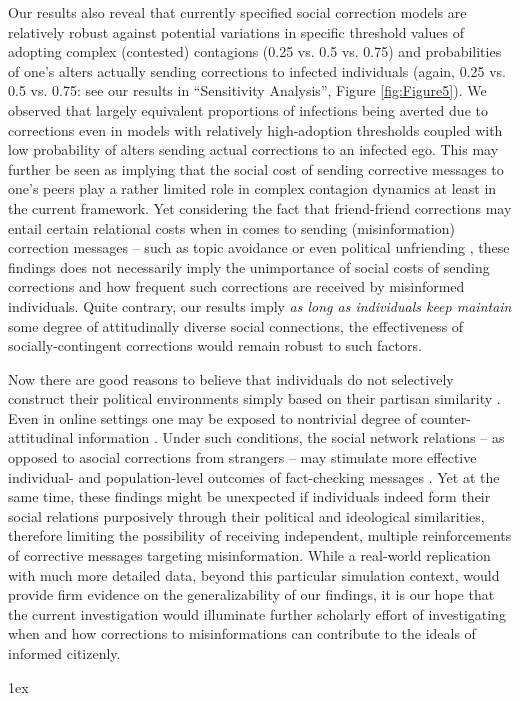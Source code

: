 \documentclass[man, 12pt, a4paper, nolmodern, noextraspace]{apa6}
\begin{document}
    Our results also reveal that currently specified social correction models are relatively robust against potential variations in specific threshold values of adopting complex (contested) contagions (0.25 vs. 0.5 vs. 0.75) and probabilities of one's alters actually sending corrections to infected individuals (again, 0.25 vs. 0.5 vs. 0.75: see our results in ``Sensitivity Analysis'', Figure \ref{fig:Figure5}). We observed that largely equivalent proportions of infections being averted due to corrections even in models with relatively high-adoption thresholds coupled with low probability of alters sending actual corrections to an infected ego. This may further be seen as implying that the social cost of sending corrective messages to one's peers play a rather limited role in complex contagion dynamics at least in the current framework. Yet considering the fact that friend-friend corrections may entail certain relational costs when in comes to sending (misinformation) correction messages -- such as topic avoidance \parencite{morey2012matters} or even political unfriending \parencite{yang2017politics, noel2011unfriending}, these findings does not necessarily imply the unimportance of social costs of sending corrections and how frequent such corrections are received by misinformed individuals. Quite contrary, our results imply \emph{as long as individuals keep maintain} some degree of attitudinally diverse social connections, the effectiveness of socially-contingent corrections would remain robust to such factors. 
    
    Now there are good reasons to believe that individuals do not selectively construct their political environments simply based on their partisan similarity \parencite{morey2012matters, lazer2010coevolution, song2015uncovering}. Even in online settings one may be exposed to nontrivial degree of counter-attitudinal information \parencite[e.g.,][]{Bakshy_2012, messing2014selective}. Under such conditions, the social network relations -- as opposed to asocial corrections from strangers -- may stimulate more effective individual- and population-level outcomes of fact-checking messages \parencite[e.g.,][]{margolin2017, bode2017see}. Yet at the same time, these findings might be unexpected if individuals indeed form their social relations purposively through their political and ideological similarities, therefore limiting the possibility of receiving independent, multiple reinforcements of corrective messages targeting misinformation. While a real-world replication with much more detailed data, beyond this particular simulation context, would provide firm evidence on the generalizability of our findings, it is our hope that the current investigation would illuminate further scholarly effort of investigating when and how corrections to misinformations can contribute to the ideals of informed citizenly.

\printbibliography
\newpage
\begingroup
\parindent 0pt
\parskip 1ex
\def\enotesize{\normalsize}
\theendnotes
\endgroup
\end{document}
